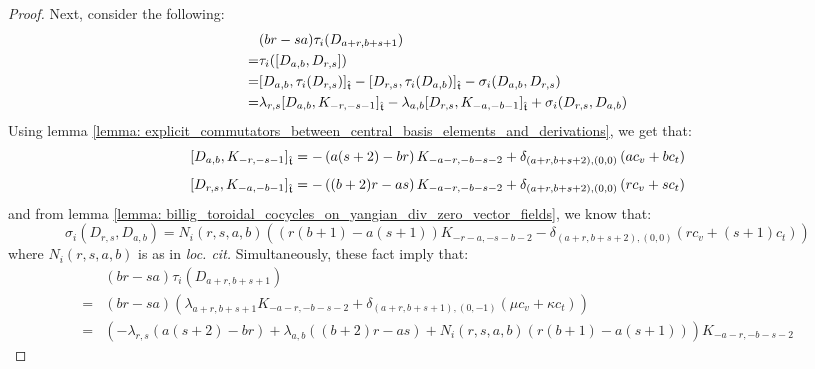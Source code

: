 \begin{proof}
                Next, consider the following:
                    $$
                        \begin{aligned}
                            & (br - sa) \tau_i(D_{a + r, b + s + 1})
                            \\
                            = & \tau_i( [D_{a, b}, D_{r, s}] )
                            \\
                            = & [D_{a, b}, \tau_i(D_{r, s})]_{\hat{\mathfrak{t}}} - [D_{r, s}, \tau_i(D_{a, b})]_{\hat{\mathfrak{t}}} - \sigma_i(D_{a, b}, D_{r, s})
                            \\
                            = & \lambda_{r, s} [D_{a, b}, K_{-r, -s - 1}]_{\hat{\mathfrak{t}}} - \lambda_{a, b} [D_{r, s}, K_{-a, -b - 1}]_{\hat{\mathfrak{t}}} + \sigma_i(D_{r, s}, D_{a, b})
                        \end{aligned}
                    $$
                Using lemma \ref{lemma: explicit_commutators_between_central_basis_elements_and_derivations}, we get that:
                    $$[D_{a, b}, K_{-r, -s - 1}]_{\hat{\mathfrak{t}}} = -\left( a(s + 2) - br \right) K_{-a - r, -b - s - 2} + \delta_{(a + r, b + s + 2), (0, 0)} \left( a c_v + b c_t \right)$$
                    $$[D_{r, s}, K_{-a, -b - 1}]_{\hat{\mathfrak{t}}} = -\left( (b + 2) r - as \right) K_{-a - r, -b - s - 2} + \delta_{(a + r, b + s + 2), (0, 0)} \left( r c_v + s c_t \right)$$
                and from lemma \ref{lemma: billig_toroidal_cocycles_on_yangian_div_zero_vector_fields}, we know that:
                    $$\sigma_i(D_{r, s}, D_{a, b}) = N_i(r, s, a, b) \left( ( r(b + 1) - a(s + 1) )K_{-r - a, -s - b - 2} - \delta_{ (a + r, b + s + 2), (0, 0) } (r c_v + (s + 1) c_t) \right)$$
                where $N_i(r, s, a, b)$ is as in \textit{loc. cit.} Simultaneously, these fact imply that:
                    \begin{equation} \label{equation: coboundary_equation_D_rs_D_ab}
                        \begin{aligned}
                            & (br - sa) \tau_i(D_{a + r, b + s + 1})
                            \\
                            = & (br - sa) \left( \lambda_{a + r, b + s + 1} K_{-a - r, -b - s - 2} + \delta_{(a + r, b + s + 1), (0, -1)}( \mu c_v + \kappa c_t ) \right)
                            \\
                            = &
                                \left( -\lambda_{r, s} \left( a(s + 2) - br \right) + \lambda_{a, b} \left( (b + 2) r - as \right) + N_i(r, s, a, b)\left( r(b + 1) - a(s + 1) \right) \right) K_{-a - r, -b - s - 2}

\end{aligned}
\end{equation}
\end{proof}
